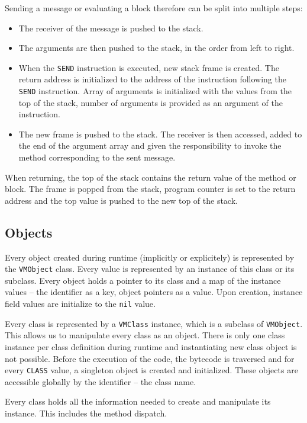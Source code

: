 \documentclass[thesis=M,english]{FITthesis}[2019/12/23]
\begin{document}
Sending a message or evaluating a block therefore can be split into multiple steps:
\begin{itemize}
	\item The receiver of the message is pushed to the stack.
	\item The arguments are then pushed to the stack, in the order from left to right.
	\item When the \texttt{SEND} instruction is executed, new stack frame is created. The return address is initialized to the address of the instruction
		following the \texttt{SEND} instruction. Array of arguments is initialized with the values from the top of the stack, number of arguments is provided
		as an argument of the instruction.
	\item The new frame is pushed to the stack. The receiver is then accessed, added to the end of the argument array and given the responsibility to invoke
		the method corresponding to the sent message.
\end{itemize}

When returning, the top of the stack contains the return value of the method or block. The frame is popped from the stack, program counter is set to the return
address and the top value is pushed to the new top of the stack.

\subsection{Objects}
Every object created during runtime (implicitly or explicitely) is represented by the \texttt{VMObject} class. Every value is represented by an instance of this
class or its subclass. Every object holds a pointer to its class and a map of the instance values -- the identifier as a key, object pointers as a value. Upon creation,
instance field values are initialize to the \texttt{nil} value.

Every class is represented by a \texttt{VMClass} instance, which is a subclass of \texttt{VMObject}. This allows us to manipulate every class as an object. There
is only one class instance per class definition during runtime and instantiating new class object is not possible. Before the execution of the code, the bytecode
is traversed and for every \texttt{CLASS} value, a singleton object is created and initialized. These objects are accessible globally by the identifier -- the class name.

Every class holds all the information needed to create and manipulate its instance. This includes the method dispatch.
\end{document}
